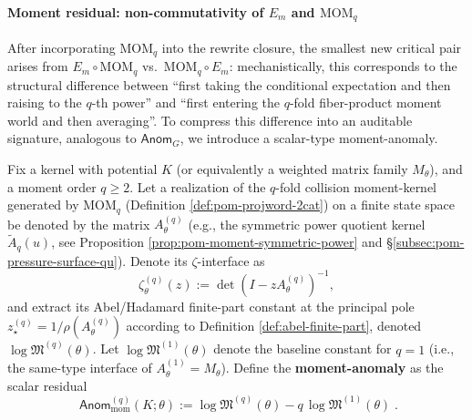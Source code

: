 \paragraph{Moment residual: non-commutativity of \texorpdfstring{$E_m$}{Em} and \texorpdfstring{$\mathrm{MOM}_q$}{MOMq}}
After incorporating \(\mathrm{MOM}_q\) into the rewrite closure, the smallest new critical pair arises from
\(
E_m\circ \mathrm{MOM}_q
\)
vs.\
\(
\mathrm{MOM}_q\circ E_m
\):
mechanistically, this corresponds to the structural difference between ``first taking the conditional expectation and then raising to the \(q\)-th power'' and ``first entering the \(q\)-fold fiber-product moment world and then averaging''.
To compress this difference into an auditable signature, analogous to \(\mathsf{Anom}_G\), we introduce a scalar-type moment-anomaly.

\begin{definition}\label{def:pom-moment-anom-signature}
Fix a kernel with potential \(K\) (or equivalently a weighted matrix family \(M_\theta\)), and a moment order \(q\ge 2\).
Let a realization of the \(q\)-fold collision moment-kernel generated by \(\mathrm{MOM}_q\) (Definition \ref{def:pom-projword-2cat}) on a finite state space be denoted by the matrix \(A^{(q)}_\theta\)
(e.g., the symmetric power quotient kernel \(\widetilde A_q(u)\), see Proposition \ref{prop:pom-moment-symmetric-power} and \S\ref{subsec:pom-pressure-surface-qu}).
Denote its \(\zeta\)-interface as
\[
\zeta^{(q)}_\theta(z):=\det(I-zA^{(q)}_\theta)^{-1},
\]
and extract its Abel/Hadamard finite-part constant at the principal pole \(z_\star^{(q)}=1/\rho(A^{(q)}_\theta)\) according to Definition \ref{def:abel-finite-part}, denoted \(\log\mathfrak{M}^{(q)}(\theta)\).
Let \(\log\mathfrak{M}^{(1)}(\theta)\) denote the baseline constant for \(q=1\) (i.e., the same-type interface of \(A^{(1)}_\theta=M_\theta\)).
Define the \textbf{moment-anomaly} as the scalar residual
\[
\boxed{\;
\mathsf{Anom}^{(q)}_{\mathrm{mom}}(K;\theta)
:=
\log\mathfrak{M}^{(q)}(\theta)
- q\,\log\mathfrak{M}^{(1)}(\theta)\;}.
\]
\end{definition}

